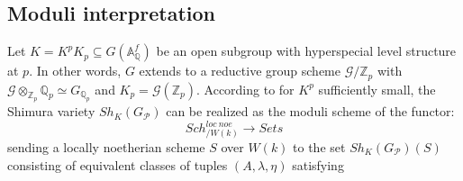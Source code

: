 \documentclass{article}
\begin{document}
\subsection{Moduli interpretation}
	Let $K=K^pK_p\subseteq G(\mathbb{A}_\mathbb{Q}^f)$ be an open subgroup with hyperspecial level structure at $p$. In other words, $G$ extends to a reductive group scheme $\mathcal{G}/\mathbb{Z}_p$ with $\mathcal{G}\otimes_{\mathbb{Z}_p}\mathbb{Q}_p\simeq G_{\mathbb{Q}_p}$ and $K_p=\mathcal{G}(\mathbb{Z}_p)$. According to \citep{Kottwitz}
for $K^p$ sufficiently small, the Shimura variety $Sh_K(G_{\mathcal{P}})$ can be realized as the moduli scheme of the functor:
\begin{equation}
Sch^{loc\  noe}_{/W(k)}\longrightarrow Sets
\end{equation}
sending a locally noetherian scheme $S$ over $W(k)$ to the set $Sh_K(G_\mathcal{P})(S)$ consisting of equivalent classes of tuples $(A,\lambda,\eta)$ satisfying
\end{document}
